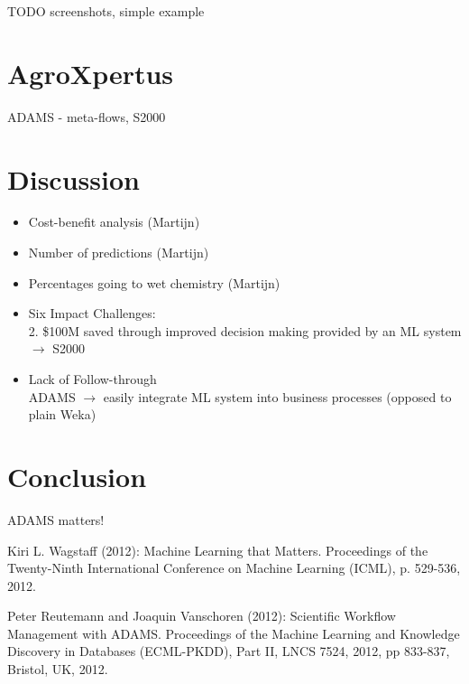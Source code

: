 \documentclass{llncs}
\begin{document}
TODO screenshots, simple example


\section{AgroXpertus}
ADAMS - meta-flows, S2000

\section{Discussion}
\begin{itemize}
  \item Cost-benefit analysis (Martijn)
  \item Number of predictions (Martijn)
  \item Percentages going to wet chemistry (Martijn)
  \item Six Impact Challenges: \\
    2. \$100M saved through improved decision making provided by an ML system $\rightarrow$ S2000
  \item Lack of Follow-through \\
	ADAMS $\rightarrow$ easily integrate ML system into business processes (opposed to plain Weka)

\end{itemize}

\section{Conclusion}
ADAMS matters!

\begin{thebibliography}{5}

Kiri L. Wagstaff (2012):
Machine Learning that Matters.
Proceedings of the Twenty-Ninth International Conference on Machine Learning (ICML), p. 529-536, 2012.

Peter Reutemann and Joaquin Vanschoren (2012):
Scientific Workflow Management with ADAMS.
Proceedings of the Machine Learning and Knowledge Discovery in Databases (ECML-PKDD), Part II, LNCS 7524, 2012, pp 833-837, Bristol, UK, 2012.

\end{thebibliography}
\end{document}
